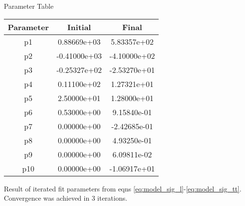 \begin{Mtable}{Parameter Table}
  \centering
  \begin{tabular}{|c|c|c|}
    \hline
    \textbf{Parameter} & \textbf{Initial} & \textbf{Final} \\
    \hline    
    p1 &  0.88669e+03 &   5.83357e+02 \\
    p2 & -0.41000e+03 &  -4.10000e+02 \\
    p3 & -0.25327e+02 &  -2.53270e+01 \\
    p4 &  0.11100e+02 &   1.27321e+01 \\
    p5 &  2.50000e+01 &   1.28000e+01 \\
    p6 &  0.53000e+00 &   9.15840e-01 \\
    p7 &  0.00000e+00 &  -2.42685e-01 \\
    p8 &  0.00000e+00 &   4.93250e-01 \\
    p9 &  0.00000e+00 &   6.09811e-02 \\
    p10 & 0.00000e+00 &  -1.06917e+01 \\
    \hline
    \end{tabular}
  \caption{Result of iterated fit parameters from eqns \ref{eq:model_sig_l}-\ref{eq:model_sig_tt}. Convergence was achieved in 3 iterations.}
  \label{tab:7-1_sig_params}
\end{Mtable}

